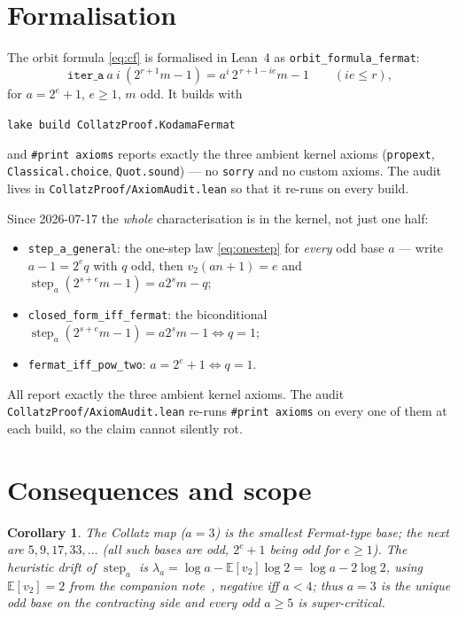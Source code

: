 \documentclass[11pt,a4paper]{article}
\theoremstyle{plain}
\newtheorem{corollary}[theorem]{Corollary}
\theoremstyle{definition}
\begin{document}
\section{Formalisation}
The orbit formula \eqref{eq:cf} is formalised in Lean~4 as \texttt{orbit\_formula\_fermat}:
\[
  \texttt{iter\_a}\ a\ i\ (2^{r+1}m-1)=a^{i}\,2^{\,r+1-ie}m-1\qquad(ie\le r),
\]
for $a=2^{e}+1$, $e\ge1$, $m$ odd. It builds with
\begin{center}
  \texttt{lake build CollatzProof.KodamaFermat}
\end{center}
and \texttt{\#print axioms} reports exactly the three ambient kernel axioms
(\texttt{propext}, \texttt{Classical.choice}, \texttt{Quot.sound}) --- no \texttt{sorry} and
no custom axioms. The audit lives in \texttt{CollatzProof/AxiomAudit.lean} so that it re-runs
on every build.

Since 2026-07-17 the \emph{whole} characterisation is in the kernel, not just one half:
\begin{itemize}[nosep]
  \item \texttt{step\_a\_general}: the one-step law \eqref{eq:onestep} for \emph{every} odd
        base $a$ --- write $a-1=2^{e}q$ with $q$ odd, then $v_2(an+1)=e$ and
        $\operatorname{step}_a(2^{s+e}m-1)=a2^{s}m-q$;
  \item \texttt{closed\_form\_iff\_fermat}: the biconditional
        $\operatorname{step}_a(2^{s+e}m-1)=a2^{s}m-1 \iff q=1$;
  \item \texttt{fermat\_iff\_pow\_two}: $a=2^{e}+1 \iff q=1$.
\end{itemize}
All report exactly the three ambient kernel axioms. The audit
\texttt{CollatzProof/AxiomAudit.lean} re-runs \texttt{\#print axioms} on every one of them at
each build, so the claim cannot silently rot.

\section{Consequences and scope}
\begin{corollary}
The Collatz map ($a=3$) is the smallest Fermat-type base; the next are $5,9,17,33,\dots$ (all
such bases are odd, $2^e+1$ being odd for $e\ge1$).
The heuristic drift of $\operatorname{step}_a$ is $\lambda_a=\log a-\mathbb{E}[v_2]\log2
=\log a-2\log2$, using $\mathbb{E}[v_2]=2$ from the companion note~\cite{geom},
negative iff $a<4$; thus $a=3$ is the unique odd base on the contracting side
and every odd $a\ge5$ is super-critical.
\end{corollary}
\end{document}
